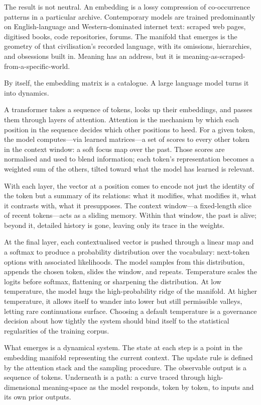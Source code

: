 \documentclass[12pt,a4paper]{article}
\begin{document}
The result is not neutral. An embedding is a lossy compression of co-occurrence patterns in a particular archive. Contemporary models are trained predominantly on English-language and Western-dominated internet text: scraped web pages, digitised books, code repositories, forums. The manifold that emerges is the geometry of that civilisation's recorded language, with its omissions, hierarchies, and obsessions built in. Meaning has an address, but it is meaning-as-scraped-from-a-specific-world.

By itself, the embedding matrix is a catalogue. A large language model turns it into dynamics.

A transformer takes a sequence of tokens, looks up their embeddings, and passes them through layers of attention. Attention is the mechanism by which each position in the sequence decides which other positions to heed. For a given token, the model computes---via learned matrices---a set of scores to every other token in the context window: a soft focus map over the past. Those scores are normalised and used to blend information; each token's representation becomes a weighted sum of the others, tilted toward what the model has learned is relevant.

With each layer, the vector at a position comes to encode not just the identity of the token but a summary of its relations: what it modifies, what modifies it, what it contrasts with, what it presupposes. The context window---a fixed-length slice of recent tokens---acts as a sliding memory. Within that window, the past is alive; beyond it, detailed history is gone, leaving only its trace in the weights.

At the final layer, each contextualised vector is pushed through a linear map and a softmax to produce a probability distribution over the vocabulary: next-token options with associated likelihoods. The model samples from this distribution, appends the chosen token, slides the window, and repeats. Temperature scales the logits before softmax, flattening or sharpening the distribution. At low temperature, the model hugs the high-probability ridge of the manifold. At higher temperature, it allows itself to wander into lower but still permissible valleys, letting rare continuations surface. Choosing a default temperature is a governance decision about how tightly the system should bind itself to the statistical regularities of the training corpus.

What emerges is a dynamical system. The state at each step is a point in the embedding manifold representing the current context. The update rule is defined by the attention stack and the sampling procedure. The observable output is a sequence of tokens. Underneath is a path: a curve traced through high-dimensional meaning-space as the model responds, token by token, to inputs and its own prior outputs.
\end{document}
